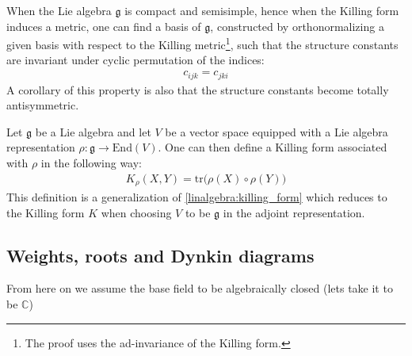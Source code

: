 	\begin{property}
		When the Lie algebra $\mathfrak{g}$ is compact and semisimple, hence when the Killing form induces a metric, one can find a basis of $\mathfrak{g}$, constructed by orthonormalizing a given basis with respect to the Killing metric\footnote{The proof uses the ad-invariance of the Killing form.}, such that the structure constants are invariant under cyclic permutation of the indices:
		\begin{gather}
			c_{ijk} = c_{jki}
		\end{gather}
		A corollary of this property is also that the structure constants become totally antisymmetric.
	\end{property}
	
	\begin{construct}
		Let $\mathfrak{g}$ be a Lie algebra and let $V$ be a vector space equipped with a Lie algebra representation $\rho:\mathfrak{g}\rightarrow\text{End}(V)$. One can then define a Killing form associated with $\rho$ in the following way:
		\begin{gather}
			\label{lie:rho_killing_form}
			K_\rho(X, Y) = \text{tr}\Big(\rho(X)\circ\rho(Y)\Big)
		\end{gather}
		This definition is a generalization of \ref{linalgebra:killing_form} which reduces to the Killing form $K$ when choosing $V$ to be $\mathfrak{g}$ in the adjoint representation.
	\end{construct}

\subsection{Weights, roots and Dynkin diagrams}

	From here on we assume the base field to be algebraically closed (lets take it to be $\mathbb{C}$)

	
